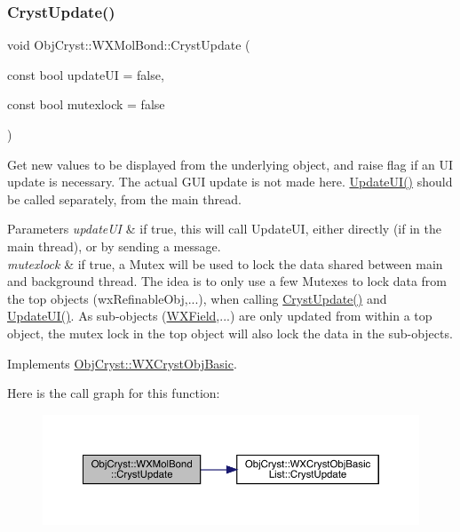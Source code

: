 \subsubsection{\texorpdfstring{CrystUpdate()}{CrystUpdate()}}
{\footnotesize\ttfamily void Obj\+Cryst\+::\+W\+X\+Mol\+Bond\+::\+Cryst\+Update (\begin{DoxyParamCaption}\item[{const bool}]{update\+UI = {\ttfamily false},  }\item[{const bool}]{mutexlock = {\ttfamily false} }\end{DoxyParamCaption})\hspace{0.3cm}{\ttfamily [virtual]}}

Get new values to be displayed from the underlying object, and raise flag if an UI update is necessary. The actual G\+UI update is not made here. \mbox{\hyperlink{class_obj_cryst_1_1_w_x_mol_bond_a75806846321a0254b833f8ff8400bc0f}{Update\+U\+I()}} should be called separately, from the main thread.


\begin{DoxyParams}{Parameters}
{\em update\+UI} & if true, this will call Update\+UI, either directly (if in the main thread), or by sending a message. \\
\hline
{\em mutexlock} & if true, a Mutex will be used to lock the data shared between main and background thread. The idea is to only use a few Mutexes to lock data from the top objects (wx\+Refinable\+Obj,...), when calling \mbox{\hyperlink{class_obj_cryst_1_1_w_x_mol_bond_a789742bc7494c3ffddda46e1b91cff54}{Cryst\+Update()}} and \mbox{\hyperlink{class_obj_cryst_1_1_w_x_mol_bond_a75806846321a0254b833f8ff8400bc0f}{Update\+U\+I()}}. As sub-\/objects (\mbox{\hyperlink{class_obj_cryst_1_1_w_x_field}{W\+X\+Field}},...) are only updated from within a top object, the mutex lock in the top object will also lock the data in the sub-\/objects. \\
\hline
\end{DoxyParams}


Implements \mbox{\hyperlink{class_obj_cryst_1_1_w_x_cryst_obj_basic_a7ac00ae2ae28f1a6fa26e6fa571186b6}{Obj\+Cryst\+::\+W\+X\+Cryst\+Obj\+Basic}}.

Here is the call graph for this function\+:
\nopagebreak
\begin{figure}[H]
\begin{center}
\leavevmode
\includegraphics[width=350pt]{class_obj_cryst_1_1_w_x_mol_bond_a789742bc7494c3ffddda46e1b91cff54_cgraph}
\end{center}
\end{figure}
\mbox{\label{class_obj_cryst_1_1_w_x_mol_bond_a75806846321a0254b833f8ff8400bc0f}} 
